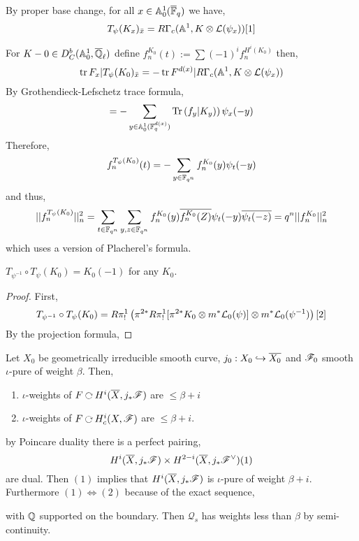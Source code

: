 \documentclass[12pt]{article}
\begin{document}
\begin{rmk}
By proper base change, for all $x \in \mathbb{A}^1_0(\overline{\mathbb{F}}_q)$ we have,
\[ T_\psi(K_x)_{\bar{x}} = R \Gamma_c(\mathbb{A}^1, K \otimes \mathcal{L}(\psi_x))[1] \]
\end{rmk}

\begin{example}
For $K-0 \in D^b_C(\mathbb{A}^1_0, \overline{\mathbb{Q}}_\ell)$ define $f_n^{K_0}(t):= \sum (-1)^i f_n^{H^i(K_0)}$ then,
\[ \operatorname{\mathrm{tr}}{F_x | T_\psi(K_0)_{\bar{x}}} = - \operatorname{\mathrm{tr}}{F^{d(x)} | R \Gamma_c(\mathbb{A}^1, K \otimes \mathcal{L}(\psi_x))} \]
By Grothendieck-Lefschetz trace formula,
\[ = -\sum_{y \in \mathbb{A}^1_0(\mathbb{F}_q^{d(x)})} \mathrm{Tr}\left( f_y | K_y) \right) \psi_x(-y) \]
Therefore,
\[ f_n^{T_\psi(K_0)}(t) = - \sum_{y \in \mathbb{F}_{q^n}} f_n^{K_0}(y) \psi_t(-y) \]
and thus,
\[ || f_n^{T_\psi(K_0)} ||_n^2 = \sum_{t \in \mathbb{F}_{q^n}} \sum_{y,z \in \mathbb{F}_{q^n}} f_n^{K_0}(y) \overline{f_n^{K_0}(Z)} \psi_t(-y) \overline{\psi_t(-z)} = q^n || f_n^{K_0} ||_n^2 \]
which uses a version of Placherel's formula. 
\end{example}

\begin{thm}
$T_{\psi^{-1}} \circ T_\psi(K_0) = K_0(-1)$ for any $K_0$.
\end{thm}

\begin{proof}
First,
\[ T_{\psi^{-1}} \circ T_\psi(K_0) = R \pi^1_! \left( \pi^{2*} R \pi^1_! [\pi^{2*} K_0 \otimes m^* \mathcal{L}_0(\psi)] \otimes m^* \mathcal{L}_0(\psi^{-1}) \right)[2] \]
By the projection formula, 
\end{proof}

\begin{thm}
Let $X_0$ be geometrically irreducible smooth curve, $j_0 : X_0 \hookrightarrow \overline{X_0}$ and $\mathscr{F}_0$ smooth $\iota$-pure of weight $\beta$. Then,
\begin{enumerate}
\item $\iota$-weights of $F \acts H^i(\overline{X}, j_* \F)$ are $\le \beta + i$
\item $\iota$-weights of $F \acts H^i_c(X, \F)$ are $\le \beta + i$.
\end{enumerate}
\end{thm}

\begin{rmk}
by Poincare duality there is a perfect pairing,
\[ H^i(\overline{X}, j_* \mathscr{F}) \times H^{2-i}(\overline{X}, j_* \mathscr{F}^\vee)(1) \]
are dual. Then $(1)$ implies that $H^i(\overline{X}, j_* \mathscr{F})$ is $\iota$-pure of weight $\beta + i$. Furthermore $(1) \iff (2)$ because of the exact sequence,
\begin{center}
\end{center} 
with $\mathbb{Q}$ supported on the boundary. Then $\mathcal{Q}_s$ has weights less than $\beta$ by semi-continuity.
\end{rmk}
\end{document}
